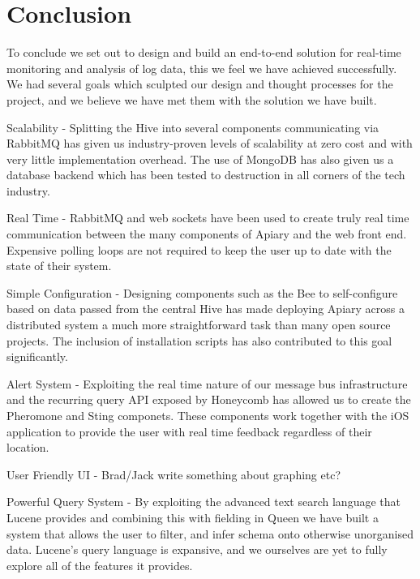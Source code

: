 \section{Conclusion}

To conclude we set out to design and build an end-to-end solution for real-time
monitoring and analysis of log data, this we feel we have achieved
successfully. We had several goals which sculpted our design and thought
processes for the project, and we believe we have met them with the solution we
have built.

Scalability - Splitting the Hive into several components communicating via
RabbitMQ has given us industry-proven levels of scalability at zero cost and
with very little implementation overhead. The use of MongoDB has also given us
a database backend which has been tested to destruction in all corners of the
tech industry.

Real Time - RabbitMQ and web sockets have been used to create truly real time
communication between the many components of Apiary and the web front end.
Expensive polling loops are not required to keep the user up to date with the
state of their system.

Simple Configuration - Designing components such as the Bee to self-configure
based on data passed from the central Hive has made deploying Apiary across a
distributed system a much more straightforward task than many open source
projects. The inclusion of installation scripts has also contributed to this
goal significantly.

Alert System - Exploiting the real time nature of our message bus
infrastructure and the recurring query API exposed by Honeycomb has allowed us
to create the Pheromone and Sting componets. These components work together
with the iOS application to provide the user with real time feedback regardless
of their location.

User Friendly UI - Brad/Jack write something about graphing etc?

Powerful Query System - By exploiting the advanced text search language that
Lucene provides and combining this with fielding in Queen we have built a
system that allows the user to filter, and infer schema onto otherwise
unorganised data. Lucene's query language is expansive, and we ourselves are
yet to fully explore all of the features it provides.
